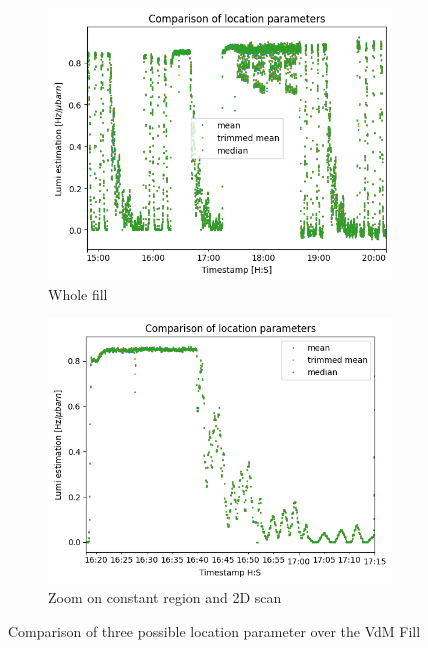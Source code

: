 \begin{figure}
    \centering
    \begin{subfigure}{0.48\textwidth}
    \includegraphics[width=\linewidth]{figures/comparison_location_whole.png}
    \caption{Whole fill}\label{fig:comparison_whole}
    \end{subfigure}
    \begin{subfigure}{0.48\textwidth}
    \includegraphics[width=\linewidth]{figures/comparison_location.png}
    \caption{Zoom on constant region and 2D scan}\label{fig:comparison_zoom}
    \end{subfigure}
    \caption{Comparison of three possible location parameter over the VdM Fill}
    \label{fig:lumi_estimator_location_param}
\end{figure}



